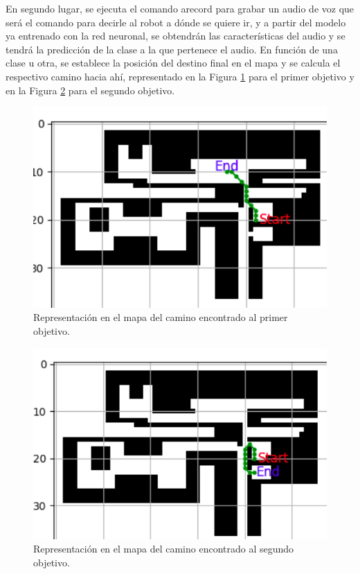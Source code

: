 En segundo lugar, se ejecuta el comando arecord para grabar un audio de voz que será el comando para decirle al robot a dónde se quiere ir, y a partir del modelo ya entrenado con la red neuronal, se obtendrán las características del audio y se tendrá la predicción de la clase a la que pertenece el audio. En función de una clase u otra, se establece la posición del destino final en el mapa y se calcula el respectivo camino hacia ahí, representado en la Figura \ref{fig:bbb} para el primer objetivo y en la Figura \ref{fig:ccc} para el segundo objetivo.\\

\begin{figure}[H]
  \centering
  \includegraphics[scale=0.4]{figs/path1} %
  \caption{ Representación en el mapa del camino encontrado al primer objetivo.}
  \label{fig:bbb}
\end{figure} 

\begin{figure}[H]
  \centering
  \includegraphics[scale=0.4]{figs/path2} %
  \caption{ Representación en el mapa del camino encontrado al segundo objetivo.}
  \label{fig:ccc}
\end{figure} 



